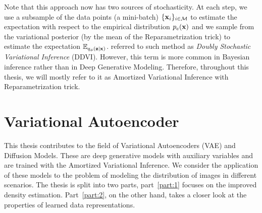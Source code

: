 Note that this approach now has two sources of stochasticity. At each step, we use a subsample of the data points (a mini-batch) $\{{\mathbf{x}}_i\}_{i \in \mathcal{M}}$ to estimate the expectation with respect to the empirical distribution $p_{e}({\mathbf{x}})$ and we sample from the variational posterior (by the mean of the Reparametrization trick) to estimate the expectation $\mathbb{E}_{q_{\phi}({\mathbf{z}}|{\mathbf{x}})}$. \citet{titsias2014doubly} referred to such method as \textit{Doubly Stochastic Variational Inference} (DDVI). 
However, this term is more common in Bayesian inference rather than in Deep Generative Modeling. Therefore, throughout this thesis, we will mostly refer to it as Amortized Variational Inference with Reparametrization trick.


\section{Variational Autoencoder}\label{sec:into_deep_generative_models}


This thesis contributes to the field of Variational Autoencoders (VAE) and Diffusion Models. These are deep generative models with auxiliary variables and are trained with the Amortized Variational Inference. We consider the application of these models to the problem of modeling the distribution of images in different scenarios. The thesis is split into two parts, part~\ref{part:1} focuses on the improved density estimation. Part~\ref{part:2}, on the other hand, takes a closer look at the properties of learned data representations.




